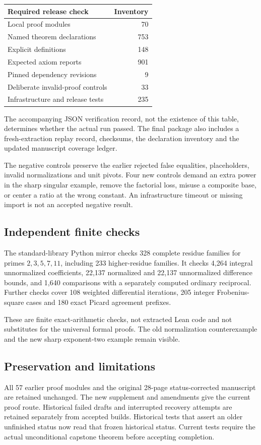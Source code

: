 \begin{center}\begin{tabular}{lr}\toprule
Required release check & Inventory\\\midrule
Local proof modules &70\\
Named theorem declarations &753\\
Explicit definitions &148\\
Expected axiom reports &901\\
Pinned dependency revisions &9\\
Deliberate invalid-proof controls &33\\
Infrastructure and release tests &235\\\bottomrule
\end{tabular}\end{center}
The accompanying JSON verification record, not the existence of this table, determines whether the actual run passed. The final package also includes a fresh-extraction replay record, checksums, the declaration inventory and the updated manuscript coverage ledger.

The negative controls preserve the earlier rejected false equalities, placeholders, invalid normalizations and unit pivots. Four new controls demand an extra power in the sharp singular example, remove the factorial loss, misuse a composite base, or center a ratio at the wrong constant. An infrastructure timeout or missing import is not an accepted negative result.

\subsection*{Independent finite checks}
The standard-library Python mirror checks 328 complete residue families for primes $2,3,5,7,11$, including 233 higher-residue families. It checks 4,264 integral unnormalized coefficients, 22,137 normalized and 22,137 unnormalized difference bounds, and 1,640 comparisons with a separately computed ordinary reciprocal. Further checks cover 108 weighted differential iterations, 205 integer Frobenius-square cases and 180 exact Picard agreement prefixes.

These are finite exact-arithmetic checks, not extracted Lean code and not substitutes for the universal formal proofs. The old normalization counterexample and the new sharp exponent-two example remain visible.

\subsection*{Preservation and limitations}
All 57 earlier proof modules and the original 28-page status-corrected manuscript are retained unchanged. The new supplement and amendments give the current proof route. Historical failed drafts and interrupted recovery attempts are retained separately from accepted builds. Historical tests that assert an older unfinished status now read that frozen historical status. Current tests require the actual unconditional capstone theorem before accepting completion.

